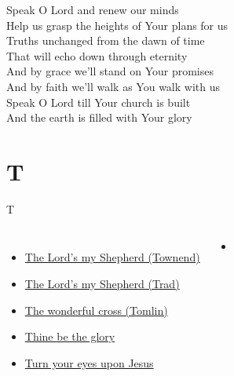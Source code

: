 \documentclass{beamer}
\begin{document}
{\begin{frame}{}
\end{frame}

\hypertarget{Speak O Lord[](Getty/Townend)3}{}
\begin{frame}{}
\fontsize{ 15 }{ 19 }\selectfont

Speak O Lord and renew our minds\\ 
Help us grasp the heights of Your plans for us\\ 
Truths unchanged from the dawn of time\\ 
That will echo down through eternity\\ 
And by grace we'll stand on Your promises\\ 
And by faith we'll walk as You walk with us\\ 
Speak O Lord till Your church is built\\ 
And the earth is filled with Your glory 

\end{frame}

}
\section{T}

\begin{frame}{T}
\begin{columns}
        \begin{itemize}
    \item \hyperlink{The Lord's my Shepherd['Psalm 23'](Townend)}{The Lord's my Shepherd (Townend)} \phantom{ 1 1}
    \item \hyperlink{The Lord's my Shepherd['Psalm 23'](Trad)}{The Lord's my Shepherd (Trad)} \phantom{ 1 1 1}
    \item \hyperlink{The wonderful cross['When I survey'](Tomlin)}{The wonderful cross (Tomlin)} \phantom{ 1 1 1 1}
    \item \hyperlink{Thine be the glory[]}{Thine be the glory } \phantom{ 1 1 1 1 1 1 1 1}
    \item \hyperlink{Turn your eyes upon Jesus[]}{Turn your eyes upon Jesus } \phantom{ 1 1 1 1 1}
\end{itemize}
        \begin{itemize}
            \item[] \phantom{1}\end{itemize}


\end{columns}

\end{frame}
\end{document}
